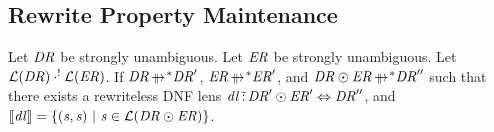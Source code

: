 \documentclass[numbers,10pt,preprint\ifanon ,nocopyrightspace\fi]{sigplanconf}
\begin{document}
\subsection{Rewrite Property Maintenance}
\begin{lemma}
  \label{lem:parallel-rewrite-concatenation-to-identity}
  Let $\mathit{DR}$ be strongly unambiguous.  Let $\mathit{ER}$ be strongly
  unambiguous.
  Let $\mathcal{L}(\mathit{DR}) \cdot^! \mathcal{L}(\mathit{ER})$.
  If $\DNFRegex \StarOf{\ParallelRewrite} \DNFRegex'$,
  $\DNFRegexAlt \StarOf{\ParallelRewrite} \DNFRegexAlt'$, and
  $\DNFRegex \ConcatDNF \DNFRegexAlt \StarOf{\ParallelRewrite} \DNFRegex''$
  such that there exists a rewriteless DNF lens
  $\mathit{dl} \,\tilde{:}\,
  \mathit{DR}' \odot \mathit{ER}' \Leftrightarrow \mathit{DR}''$, and
  $[ \! [\mathit{dl}] \! ] =
  \{(\mathit{s},\mathit{s}) ~|~ \mathit{s} \in
    \mathcal{L}(\mathit{DR} \odot \mathit{ER})\}$.
\end{lemma}
\end{document}
